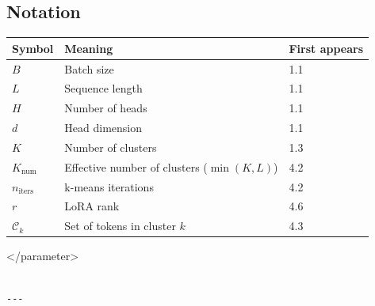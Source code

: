 \subsection{Notation}

\begin{table}[H]
\centering
\small
\begin{tabular}{lll}
\toprule
\textbf{Symbol} & \textbf{Meaning} & \textbf{First appears} \\
\midrule
$B$ & Batch size & 1.1 \\
$L$ & Sequence length & 1.1 \\
$H$ & Number of heads & 1.1 \\
$d$ & Head dimension & 1.1 \\
$K$ & Number of clusters & 1.3 \\
$K_{\text{num}}$ & Effective number of clusters ($\min(K, L)$) & 4.2 \\
$n_{\text{iters}}$ & k-means iterations & 4.2 \\
$r$ & LoRA rank & 4.6 \\
$\mathcal{C}_k$ & Set of tokens in cluster $k$ & 4.3 \\
\bottomrule
\end{tabular}
\end{table}
\textless{}/parameter\textgreater{}
\begin{lstlisting}

---
\end{lstlisting}